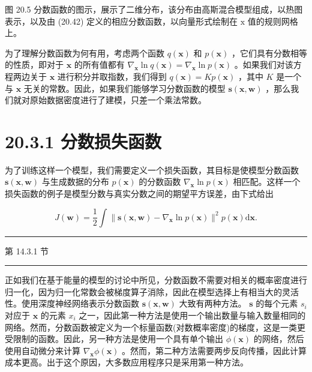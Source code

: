 \documentclass[10pt]{article}
\newcommand{\HRule}{\begin{center}\rule{0.9\linewidth}{0.2mm}\end{center}}
\begin{document}
图 20.5 分数函数的图示，展示了二维分布，该分布由高斯混合模型组成，以热图表示，以及由 (20.42) 定义的相应分数函数，以向量形式绘制在 \(\mathrm{x}\) 值的规则网格上。

为了理解分数函数为何有用，考虑两个函数 \(q\left( \mathbf{x}\right)\) 和 \(p\left( \mathbf{x}\right)\) ，它们具有分数相等的性质，即对于 \(\mathbf{x}\) 的所有值都有 \({\nabla }_{\mathbf{x}}\ln q\left( \mathbf{x}\right)  = {\nabla }_{\mathbf{x}}\ln p\left( \mathbf{x}\right)\) 。如果我们对该方程两边关于 \(\mathbf{x}\) 进行积分并取指数，我们得到 \(q\left( \mathbf{x}\right)  = {Kp}\left( \mathbf{x}\right)\) ，其中 \(K\) 是一个与 \(\mathbf{x}\) 无关的常数。因此，如果我们能够学习分数函数的模型 \(\mathbf{s}\left( {\mathbf{x},\mathbf{w}}\right)\) ，那么我们就对原始数据密度进行了建模，只差一个乘法常数。

\section*{20.3.1 分数损失函数}

为了训练这样一个模型，我们需要定义一个损失函数，其目标是使模型分数函数 \(\mathbf{s}\left( {\mathbf{x},\mathbf{w}}\right)\) 与生成数据的分布 \(p\left( \mathbf{x}\right)\) 的分数函数 \({\nabla }_{\mathbf{x}}\ln p\left( \mathbf{x}\right)\) 相匹配。这样一个损失函数的例子是模型分数与真实分数之间的期望平方误差，由下式给出

\[
J\left( \mathbf{w}\right)  = \frac{1}{2}\int \parallel \mathbf{s}\left( {\mathbf{x},\mathbf{w}}\right)  - {\nabla }_{\mathbf{x}}\ln p\left( \mathbf{x}\right) {\parallel }^{2}p\left( \mathbf{x}\right) \mathrm{d}\mathbf{x}. \tag{20.43}
\]

\HRule

第 14.3.1 节

\HRule

正如我们在基于能量的模型的讨论中所见，分数函数不需要对相关的概率密度进行归一化，因为归一化常数会被梯度算子消除，因此在模型选择上有相当大的灵活性。使用深度神经网络表示分数函数 \(\mathbf{s}\left( {\mathbf{x},\mathbf{w}}\right)\) 大致有两种方法。 \(\mathbf{s}\) 的每个元素 \({s}_{i}\) 对应于 \(\mathbf{x}\) 的元素 \({x}_{i}\) 之一，因此第一种方法是使用一个输出数量与输入数量相同的网络。然而，分数函数被定义为一个标量函数(对数概率密度)的梯度，这是一类更受限制的函数。因此，另一种方法是使用一个具有单个输出 \(\phi \left( \mathbf{x}\right)\) 的网络，然后使用自动微分来计算 \({\nabla }_{\mathbf{x}}\phi \left( \mathbf{x}\right)\) 。然而，第二种方法需要两步反向传播，因此计算成本更高。出于这个原因，大多数应用程序只是采用第一种方法。
\end{document}
